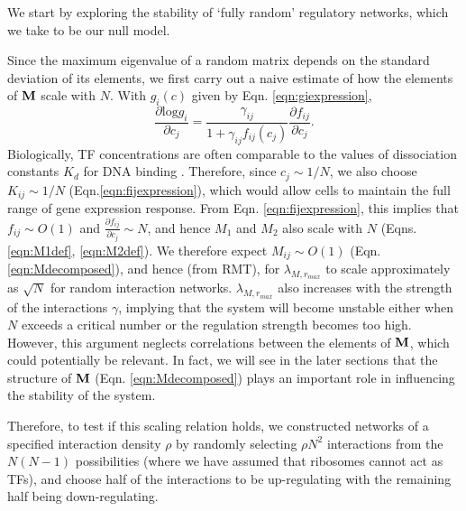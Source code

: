 \documentclass[10pt]{article}
\begin{document}
We start by exploring the stability of `fully random' regulatory networks, which we take to be our null model. 

Since the maximum eigenvalue of a random matrix depends on the standard deviation of its elements, we first carry out a naive estimate of how the elements of $\bf{M}$ scale with $N$. With $g_i({c})$ given by Eqn. \ref{eqn:giexpression}, 
\begin{equation}
    \frac{\partial \text{log} g_i}{\partial c_j} = \frac{\gamma_{ij}}{1+\gamma_{ij} f_{ij}(c_j)} \frac{\partial f_{ij}}{\partial c_j}.
\end{equation}
Biologically, TF concentrations are often comparable to the values of dissociation constants $K_d$ for DNA binding \cite{milo2015cell}. Therefore, since $c_j \sim 1/N$, we also choose $K_{ij} \sim 1/N$ (Eqn.\ref{eqn:fijexpression}), which would allow cells to maintain the full range of gene expression response. From Eqn. \ref{eqn:fijexpression}, this implies that $f_{ij} \sim O(1)$ and $\frac{\partial f_{ij}}{\partial c_j} \sim N$, and hence $M_1$ and $M_2$ also scale with $N$ (Eqns. \ref{eqn:M1def}, \ref{eqn:M2def}). We therefore expect $M_{ij} \sim O(1)$ (Eqn. \ref{eqn:Mdecomposed}), and hence (from RMT), for $\lambda_{M,r_{max}}$ to scale approximately as $\sqrt{N}$ for random interaction networks. $\lambda_{M,r_{max}}$ also increases with the strength of the interactions $\gamma$, implying that the system will become unstable either when $N$ exceeds a critical number or the regulation strength becomes too high. However, this argument neglects correlations between the elements of $\bf{M}$, which could potentially be relevant. In fact, we will see in the later sections that the structure of $\bf{M}$ (Eqn. \ref{eqn:Mdecomposed}) plays an important role in influencing the stability of the system.

Therefore, to test if this scaling relation holds, we constructed networks of a specified interaction density $\rho$ by randomly selecting $\rho N^2$ interactions from the $N(N-1)$ possibilities (where we have assumed that ribosomes cannot act as TFs), and choose half of the interactions to be up-regulating with the remaining half being down-regulating. 
\end{document}
